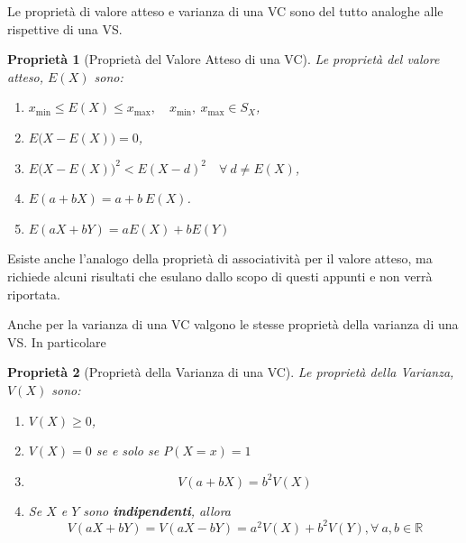 \documentclass[
  11pt,
]{book}
\providecommand{\tightlist}{%
  \setlength{\itemsep}{0pt}\setlength{\parskip}{0pt}}
\theoremstyle{mytheoremstyle}
\newtheorem{proposition}{Proprietà}[section]
\theoremstyle{mydefstyle}
\begin{document}
Le proprietà di valore atteso e varianza di una VC sono del tutto analoghe alle rispettive di una VS.

\begin{info}

\begin{proposition}[Proprietà del Valore Atteso di una VC]

Le proprietà del valore atteso, \(E(X)\) sono:

\begin{enumerate}
\def\labelenumi{\arabic{enumi}.}
\tightlist
\item
  \(x_{\min} \leq E(X) \leq x_{\max}, \quad x_{\min},\ x_{\max}\in S_{X}\),
\item
  \(E\Big(X - E(X)\Big) = 0\),
\item
  \(E\Big(X - E(X)\Big)^{2} < E(X - d)^{2} \quad\forall\ d \ne E(X)\),
\item
  \(E(a + b X) = a + b\ E(X)\).
\item
  \(E(aX+bY)=aE(X)+bE(Y)\)
\end{enumerate}

\end{proposition}

\end{info}

Esiste anche l'analogo della proprietà di associatività per il valore atteso, ma richiede
alcuni risultati che esulano dallo scopo di questi appunti e non verrà riportata.

Anche per la varianza di una VC valgono le stesse proprietà della varianza di una VS. In particolare

\begin{info}

\begin{proposition}[Proprietà della Varianza di una VC]

Le proprietà della Varianza, \(V(X)\) sono:

\begin{enumerate}
\def\labelenumi{\arabic{enumi}.}
\tightlist
\item
  \(V(X)\geq 0\),
\item
  \(V(X)=0\) se e solo se \(P(X=x)=1\)
\item
  \[V(a+bX)=b^2V(X)\]
\item
  Se \(X\) e \(Y\) sono \textbf{indipendenti}, allora
  \[V(aX+bY)=V(aX-bY)=a^2V(X)+b^2V(Y), \forall~a,b\in\mathbb{R}\]
\end{enumerate}

\end{proposition}

\end{info}
\end{document}
